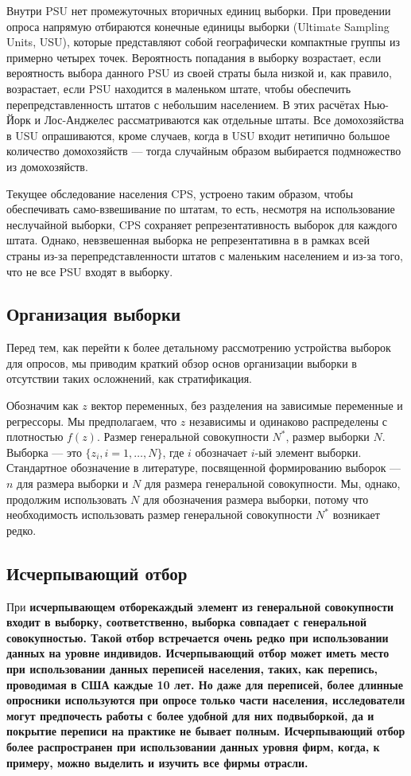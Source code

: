 Внутри PSU нет промежуточных вторичных единиц выборки. При проведении опроса напрямую отбираются конечные единицы выборки (Ultimate Sampling Units, USU), которые представляют собой географически компактные группы из примерно четырех точек. Вероятность попадания в выборку возрастает, если вероятность выбора данного PSU из своей страты была низкой и, как правило, возрастает, если PSU находится в маленьком штате, чтобы обеспечить перепредставленность штатов с небольшим населением. В этих расчётах Нью-Йорк и Лос-Анджелес рассматриваются как отдельные штаты. Все домохозяйства в USU опрашиваются, кроме случаев, когда в USU входит нетипично большое количество домохозяйств --- тогда случайным образом выбирается подмножество из домохозяйств. 

Текущее обследование населения CPS, устроено таким образом, чтобы обеспечивать само-взвешивание по штатам, то есть, несмотря на использование неслучайной выборки, CPS сохраняет репрезентативность выборок для каждого штата. Однако, невзвешенная выборка не репрезентативна в в рамках всей страны из-за перепредставленности штатов с маленьким населением и из-за того, что не все PSU входят в выборку. 

\subsection{Организация выборки}

Перед тем, как перейти к более детальному рассмотрению устройства выборок для опросов, мы приводим краткий обзор основ организации выборки в отсутствии таких осложнений, как стратификация. 

Обозначим как $z$ вектор переменных, без разделения на зависимые переменные и регрессоры. Мы предполагаем, что $z$ независимы и одинаково распределены с плотностью $f(z)$. Размер генеральной совокупности $N^*$, размер выборки $N$. Выборка --- это $\{ z_i,i=1,\ldots,N \}$, где $i$ обозначает $i$-ый элемент выборки. Стандартное обозначение в литературе, посвященной формированию выборок --- $n$ для размера выборки и $N$ для размера генеральной совокупности. Мы, однако, продолжим использовать $N$ для обозначения размера выборки, потому что необходимость использовать размер генеральной совокупности $N^*$ возникает редко. 

\subsection*{Исчерпывающий отбор}

При \bfseries исчерпывающем отборе\mdseries каждый элемент из генеральной совокупности входит в выборку, соответственно, выборка совпадает с генеральной совокупностью. Такой отбор встречается очень редко при использовании данных на уровне индивидов. Исчерпывающий отбор может иметь место при использовании данных переписей населения, таких, как перепись, проводимая в США каждые 10 лет. Но даже для переписей, более длинные опросники используются при опросе только части населения, исследователи могут предпочесть работы с более удобной для них подвыборкой, да и покрытие переписи на практике не бывает полным. Исчерпывающий отбор более распространен при использовании данных уровня фирм, когда, к примеру, можно выделить и изучить все фирмы отрасли. 

